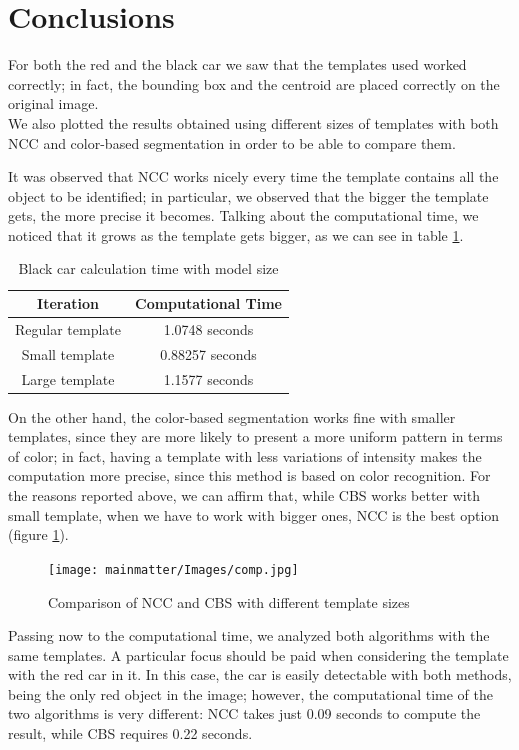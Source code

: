 \newpage
\section*{Conclusions}
For both the red and the black car we saw that the templates used worked correctly; in fact, the bounding box and the centroid are placed correctly on the original image.\\
We also plotted the results obtained using different sizes of templates with both NCC and color-based segmentation in order to be able to compare them.

It was observed that NCC works nicely every time the template contains all the object to be identified; in particular, we observed that the bigger the template gets, the more precise it becomes. Talking about the computational time, we noticed that it grows as the template gets bigger, as we can see in table \ref{tab:3templatesize}. 

\begin{table}[h]
\centering
\begin{tabular}{|c|c|}
\hline
\textbf{Iteration} & \textbf{Computational Time} \\ \hline
Regular template         & 1.0748 seconds \\ \hline
Small template         & 0.88257 seconds \\ \hline
Large template         & 1.1577 seconds \\ \hline
\end{tabular}
\caption{Black car calculation time with model size}
\label{tab:3templatesize}
\end{table}

On the other hand, the color-based segmentation works fine with smaller templates, since they are more likely to present a more uniform pattern in terms of color; in fact, having a template with less variations of intensity makes the computation more precise, since this method is based on color recognition. For the reasons reported above, we can affirm that, while CBS works better with small template, when we have to work with bigger ones, NCC is the best option (figure \ref{fig:NCCvsCBS}).

\begin{figure}[h]
    \centering
    \texttt{[image: mainmatter/Images/comp.jpg]}
    \caption{Comparison of NCC and CBS with different template sizes}
    \label{fig:NCCvsCBS}
\end{figure}
\newpage
Passing now to the computational time, we analyzed both algorithms with the same templates. 
A particular focus should be paid when considering the template with the red car in it. In this case, the car is easily detectable with both methods, being the only red object in the image; however, the computational time of the two algorithms is very different: NCC takes just 0.09 seconds to compute the result, while CBS requires 0.22 seconds.\\



